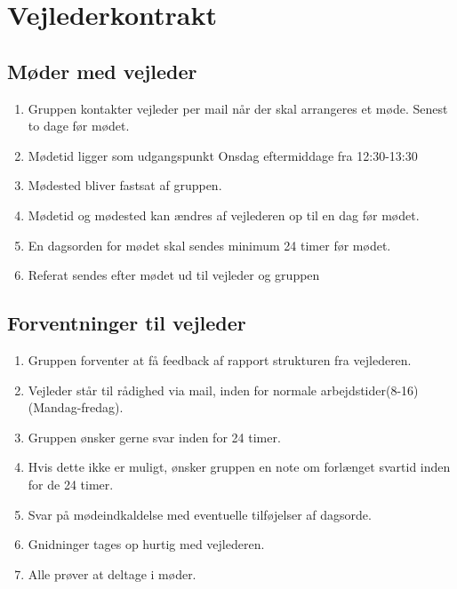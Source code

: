 \chapter{Vejlederkontrakt}

\section{Møder med vejleder}
	\begin{enumerate}
	\item Gruppen kontakter vejleder per mail når der skal arrangeres et møde. Senest to dage før mødet.
    \item Mødetid ligger som udgangspunkt Onsdag eftermiddage fra 12:30-13:30
    \item Mødested bliver fastsat af gruppen.
    \item Mødetid og mødested kan ændres af vejlederen op til en dag før mødet.
    \item En dagsorden for mødet skal sendes minimum 24 timer før mødet.
    \item Referat sendes efter mødet ud til vejleder og gruppen
	\end{enumerate}

\section{Forventninger til vejleder}
	\begin{enumerate}
	\item Gruppen forventer at få feedback af rapport strukturen fra vejlederen.
    \item Vejleder står til rådighed via mail, inden for normale arbejdstider(8-16)(Mandag-fredag).
    \item Gruppen ønsker gerne svar inden for 24 timer.
    \item Hvis dette ikke er muligt, ønsker gruppen en note om forlænget svartid inden for de 24 timer.
    \item Svar på mødeindkaldelse med eventuelle tilføjelser af dagsorde.
    \item Gnidninger tages op hurtig med vejlederen.
    \item Alle prøver at deltage i møder.
	\end{enumerate}